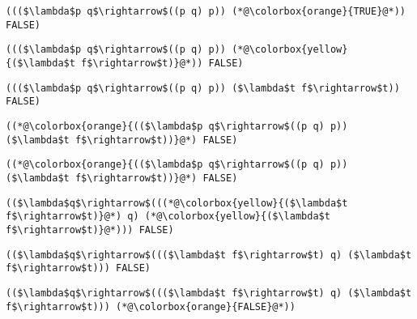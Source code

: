 \documentclass{beamer}
\begin{document}
\begin{frame}[fragile]{\CurrentSection}
\lstset{basicstyle=\ttfamily\small}\lstset{numbers=none}\lstset{language=ML}\begin{lstlisting}
((($\lambda$p q$\rightarrow$((p q) p)) (*@\colorbox{orange}{TRUE}@*)) FALSE)
\end{lstlisting}
\pause\lstset{language=ML}\begin{lstlisting}
((($\lambda$p q$\rightarrow$((p q) p)) (*@\colorbox{yellow}{($\lambda$t f$\rightarrow$t)}@*)) FALSE)
\end{lstlisting}

\end{frame}

\begin{frame}[fragile]{\CurrentSection}
\lstset{basicstyle=\ttfamily\small}\lstset{numbers=none}\lstset{language=ML}\begin{lstlisting}
((($\lambda$p q$\rightarrow$((p q) p)) ($\lambda$t f$\rightarrow$t)) FALSE)
\end{lstlisting}
\pause\lstset{language=ML}\begin{lstlisting}
((*@\colorbox{orange}{(($\lambda$p q$\rightarrow$((p q) p)) ($\lambda$t f$\rightarrow$t))}@*) FALSE)
\end{lstlisting}

\end{frame}

\begin{frame}[fragile]{\CurrentSection}
\lstset{basicstyle=\ttfamily\small}\lstset{numbers=none}\lstset{language=ML}\begin{lstlisting}
((*@\colorbox{orange}{(($\lambda$p q$\rightarrow$((p q) p)) ($\lambda$t f$\rightarrow$t))}@*) FALSE)
\end{lstlisting}
\pause\lstset{language=ML}\begin{lstlisting}
(($\lambda$q$\rightarrow$(((*@\colorbox{yellow}{($\lambda$t f$\rightarrow$t)}@*) q) (*@\colorbox{yellow}{($\lambda$t f$\rightarrow$t)}@*))) FALSE)
\end{lstlisting}

\end{frame}

\begin{frame}[fragile]{\CurrentSection}
\lstset{basicstyle=\ttfamily\small}\lstset{numbers=none}\lstset{language=ML}\begin{lstlisting}
(($\lambda$q$\rightarrow$((($\lambda$t f$\rightarrow$t) q) ($\lambda$t f$\rightarrow$t))) FALSE)
\end{lstlisting}
\pause\lstset{language=ML}\begin{lstlisting}
(($\lambda$q$\rightarrow$((($\lambda$t f$\rightarrow$t) q) ($\lambda$t f$\rightarrow$t))) (*@\colorbox{orange}{FALSE}@*))
\end{lstlisting}

\end{frame}
\end{document}
